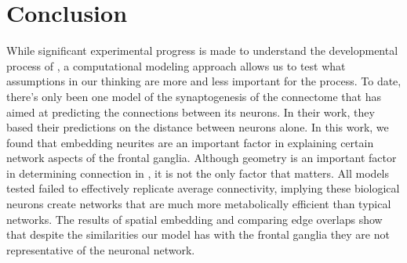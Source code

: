 \section{Conclusion}

While significant experimental progress is made to understand the developmental process of \ce, a computational modeling approach allows us to test what assumptions in our thinking are more and less important for the process. 
To date, there’s only been one model of the synaptogenesis of the \ce connectome that has aimed at predicting the connections between its neurons. 
In their work, they based their predictions on the distance between neurons alone. 
In this work, we found that embedding neurites are an important factor in explaining certain network aspects of the \ce frontal ganglia.
Although geometry is an important factor in determining connection in \ce, it is not the only factor that matters.
All models tested failed to effectively replicate average connectivity, implying these biological neurons create networks that are much more metabolically efficient than typical networks.
The results of spatial embedding and comparing edge overlaps show that despite the similarities our model has with the \ce frontal ganglia they are not representative of the \ce neuronal network.